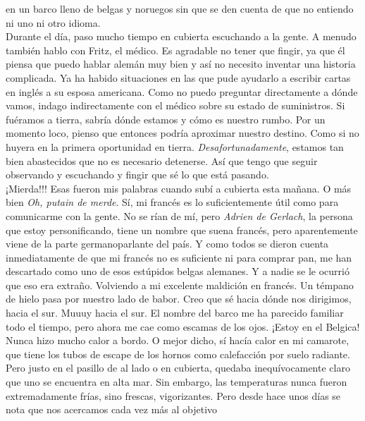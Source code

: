 \documentclass{article}
\begin{document}
    en un barco lleno de belgas y noruegos sin que se den cuenta de que no entiendo ni uno ni otro idioma.\\
    \noindent Durante el día, paso mucho tiempo en cubierta escuchando a la gente. A menudo también hablo con Fritz, el
    médico.
    Es agradable no tener que fingir, ya que él piensa que puedo hablar alemán muy bien y así no necesito inventar
    una
    historia complicada. Ya ha habido situaciones en las que pude ayudarlo a escribir cartas en inglés a su esposa
    americana. Como no puedo preguntar directamente a dónde vamos, indago indirectamente con el médico sobre su
    estado
    de suministros. Si fuéramos a tierra, sabría dónde estamos y cómo es nuestro rumbo. Por un momento loco, pienso
    que entonces podría aproximar nuestro destino. Como si no huyera en la primera oportunidad en tierra.
    \textit{Desafortunadamente}, estamos tan bien abastecidos que no es necesario detenerse. Así que tengo que seguir
    observando y escuchando y fingir que sé lo que está pasando.
    \\
    \noindent ¡Mierda!!! Esas fueron mis palabras cuando subí a cubierta esta mañana. O más bien \textit{Oh, putain de merde}.
    Sí, mi francés es lo suficientemente útil como para comunicarme con la gente. No se rían de mí, pero \textit{Adrien
      de
      Gerlach}, la persona que estoy personificando, tiene un nombre que suena francés, pero aparentemente viene
    de
    la parte germanoparlante del país. Y como todos se dieron cuenta inmediatamente de que mi francés no es
    suficiente
    ni para comprar pan, me han descartado como uno de esos estúpidos belgas alemanes. Y a nadie se le ocurrió que
    eso
    era extraño. Volviendo a mi excelente maldición en francés. Un témpano de hielo pasa por nuestro lado de babor.
    Creo que sé hacia dónde nos dirigimos, hacia el sur. Muuuy hacia el sur. El nombre del barco me ha parecido
    familiar todo el tiempo, pero ahora me cae como escamas de los ojos. ¡Estoy en el Belgica!\\
    \noindent Nunca hizo mucho calor a bordo. O mejor dicho, sí hacía calor en mi camarote, que tiene los tubos de escape de
    los hornos como calefacción por suelo radiante. Pero justo en el pasillo de al lado o en cubierta, quedaba
    inequívocamente claro que uno se encuentra en alta mar. Sin embargo, las temperaturas nunca fueron
    extremadamente
    frías, sino frescas, vigorizantes. Pero desde hace unos días se nota que nos acercamos cada vez más al objetivo
\end{document}
